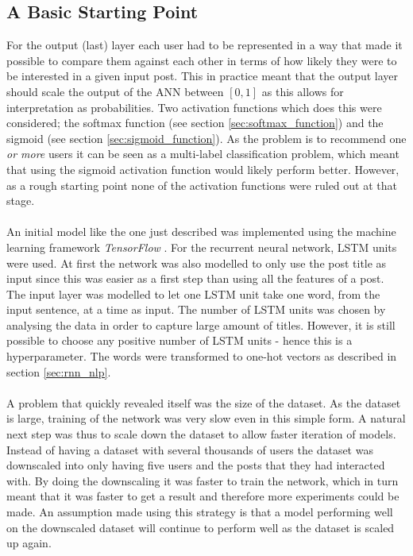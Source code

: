 \subsection{A Basic Starting Point}\label{method_basic_start_point}
For the output (last) layer each user had to be represented in a way that made it possible to compare them against each other in terms of how likely they were to be interested in a given input post. This in practice meant that the output layer should scale the output of the ANN between $[0,1]$ as this allows for interpretation as probabilities. Two activation functions which does this were considered; the softmax function (see section \ref{sec:softmax_function}) and the sigmoid (see section \ref{sec:sigmoid_function}). As the problem is to recommend one \textit{or more} users it can be seen as a multi-label classification problem, which meant that using the sigmoid activation function would likely perform better. However, as a rough starting point none of the activation functions were ruled out at that stage.
\\\\
An initial model like the one just described was implemented using the machine learning framework \textit{TensorFlow} \parencite{tensorflow2015whitepaper}. For the recurrent neural network, LSTM units were used. At first the network was also modelled to only use the post title as input since this was easier as a first step than using all the features of a post. The input layer was modelled to let one LSTM unit take one word, from the input sentence, at a time as input. The number of LSTM units was chosen by analysing the data in order to capture large amount of titles. However, it is still possible to choose any positive number of LSTM units - hence this is a hyperparameter. The words were transformed to one-hot vectors as described in section \ref{sec:rnn_nlp}.
\\\\
A problem that quickly revealed itself was the size of the dataset. As the dataset is large, training of the network was very slow even in this simple form. A natural next step was thus to scale down the dataset to allow faster iteration of models. Instead of having a dataset with several thousands of users the dataset was downscaled into only having five users and the posts that they had interacted with. By doing the downscaling it was faster to train the network, which in turn meant that it was faster to get a result and therefore more experiments could be made. An assumption made using this strategy is that a model performing well on the downscaled dataset will continue to perform well as the dataset is scaled up again. 
